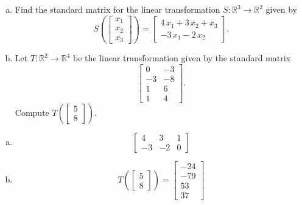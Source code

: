 
\begin{exerciseStatement}

\begin{enumerate}[(a)]
\item Find the standard matrix for the linear transformation \(S:\mathbb{R}^ 3  \to \mathbb{R}^ 2 \) given by \[S\left(  \left[\begin{array}{c}
x_{1} \\
x_{2} \\
x_{3}
\end{array}\right]  \right) =  \left[\begin{array}{c}
4 \, x_{1} + 3 \, x_{2} + x_{3} \\
-3 \, x_{1} - 2 \, x_{2}
\end{array}\right] .\]
\item Let \(T:\mathbb{R}^ 2  \to \mathbb{R}^ 4 \) be the linear transformation given by the standard matrix \[ \left[\begin{array}{cc}
0 & -3 \\
-3 & -8 \\
1 & 6 \\
1 & 4
\end{array}\right] .\] Compute \(T\left( \left[\begin{array}{c}
5 \\
8
\end{array}\right]  \right)\). 
\end{enumerate}
    
\end{exerciseStatement}
    
\begin{exerciseAnswer} 

\begin{enumerate}[(a)]
\item \[ \left[\begin{array}{ccc}
4 & 3 & 1 \\
-3 & -2 & 0
\end{array}\right] \]
\item \[T\left( \left[\begin{array}{c}
5 \\
8
\end{array}\right]  \right)= \left[\begin{array}{c}
-24 \\
-79 \\
53 \\
37
\end{array}\right] \]
\end{enumerate}
    
\end{exerciseAnswer}
    
